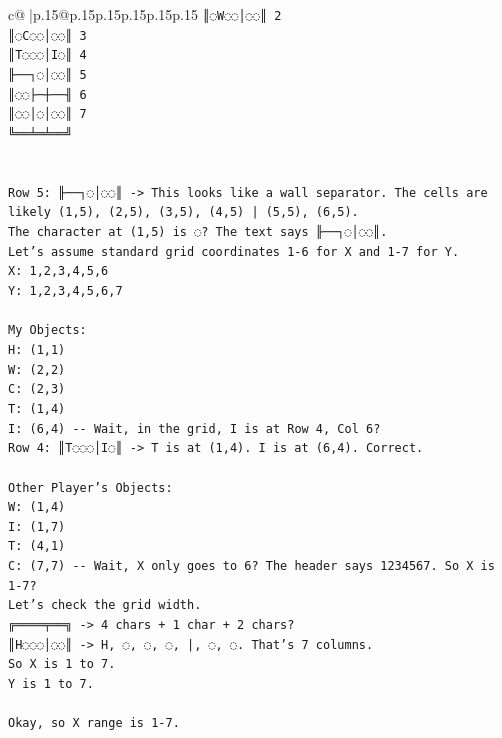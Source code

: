 \documentclass{article}
\begin{document}
{\begin{supertabular}{c@{$\;$}|p{.15\linewidth}@{}p{.15\linewidth}p{.15\linewidth}p{.15\linewidth}p{.15\linewidth}p{.15\linewidth}}
{{{\texttt{║◌W◌◌│◌◌║ 2} \\
\texttt{║◌C◌◌│◌◌║ 3} \\
\texttt{║T◌◌◌│I◌║ 4} \\
\texttt{╟──┐◌│◌◌║ 5} \\
\texttt{║◌◌├─┼──╢ 6} \\
\texttt{║◌◌│◌│◌◌║ 7} \\
\texttt{╚══╧═╧══╝} \\
\\ 
\\ 
\texttt{Row 5: ╟──┐◌│◌◌║ {-}> This looks like a wall separator. The cells are likely (1,5), (2,5), (3,5), (4,5) | (5,5), (6,5).} \\
\texttt{The character at (1,5) is ◌? The text says ╟──┐◌│◌◌║.} \\
\texttt{Let's assume standard grid coordinates 1{-}6 for X and 1{-}7 for Y.} \\
\texttt{X: 1,2,3,4,5,6} \\
\texttt{Y: 1,2,3,4,5,6,7} \\
\\ 
\texttt{My Objects:} \\
\texttt{H: (1,1)} \\
\texttt{W: (2,2)} \\
\texttt{C: (2,3)} \\
\texttt{T: (1,4)} \\
\texttt{I: (6,4) {-}{-} Wait, in the grid, I is at Row 4, Col 6?} \\
\texttt{Row 4: ║T◌◌◌│I◌║ {-}> T is at (1,4). I is at (6,4). Correct.} \\
\\ 
\texttt{Other Player's Objects:} \\
\texttt{W: (1,4)} \\
\texttt{I: (1,7)} \\
\texttt{T: (4,1)} \\
\texttt{C: (7,7) {-}{-} Wait, X only goes to 6? The header says 1234567. So X is 1{-}7?} \\
\texttt{Let's check the grid width.} \\
\texttt{╔════╤══╗ {-}> 4 chars + 1 char + 2 chars?} \\
\texttt{║H◌◌◌│◌◌║ {-}> H, ◌, ◌, ◌, |, ◌, ◌. That's 7 columns.} \\
\texttt{So X is 1 to 7.} \\
\texttt{Y is 1 to 7.} \\
\\ 
\texttt{Okay, so X range is 1{-}7.} \\
}}}
\end{supertabular}}
\end{document}
